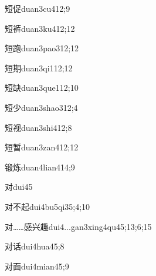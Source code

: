 \begin{verbete}{短促}{duan3cu4}{12;9}
\end{verbete}
\begin{verbete}{短裤}{duan3ku4}{12;12}
\end{verbete}
\begin{verbete}{短跑}{duan3pao3}{12;12}
\end{verbete}
\begin{verbete}{短期}{duan3qi1}{12;12}
\end{verbete}
\begin{verbete}{短缺}{duan3que1}{12;10}
\end{verbete}
\begin{verbete}{短少}{duan3shao3}{12;4}
\end{verbete}
\begin{verbete}{短视}{duan3shi4}{12;8}
\end{verbete}
\begin{verbete}{短暂}{duan3zan4}{12;12}
\end{verbete}
\begin{verbete}{锻炼}{duan4lian4}{14;9}
\end{verbete}
\begin{verbete}{对}{dui4}{5}
\end{verbete}
\begin{verbete}{对不起}{dui4bu5qi3}{5;4;10}
\end{verbete}
\begin{verbete}{对……感兴趣}{dui4...gan3xing4qu4}{5;13;6;15}
\end{verbete}
\begin{verbete}{对话}{dui4hua4}{5;8}
\end{verbete}
\begin{verbete}{对面}{dui4mian4}{5;9}
\end{verbete}
